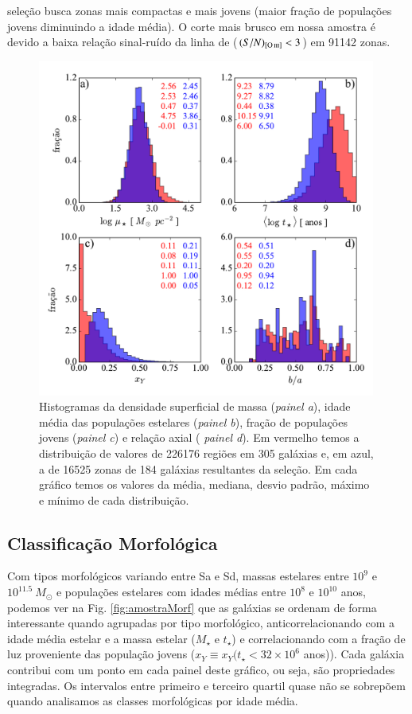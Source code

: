 seleção busca zonas mais compactas e mais jovens (maior fração de populações jovens diminuindo a idade
média). O corte mais brusco em nossa amostra é devido a baixa relação sinal-ruído da linha de \oIII
($(S/N)_{\oIII} < 3$) em 91142 zonas.
\begin{figure}
	\centering
	\includegraphics[width=0.99\textwidth]{figuras/histosample.pdf}
	\caption[Histogramas: densidade superficial de massa, idade média, fração de populações jovens e
	relação axial.] 
	{Histogramas da densidade superficial de massa ({\em painel a}), idade média das populações
estelares ({\em painel b}), fração de populações jovens ({\em painel c}) e relação axial ({\em
painel d}). Em vermelho temos a distribuição de valores de 226176 regiões em 305 galáxias e, em
azul, a de 16525 zonas de 184 galáxias resultantes da seleção. Em cada gráfico temos os valores da
média, mediana, desvio padrão, máximo e mínimo de cada distribuição.}
	\label{fig:histosample}
\end{figure}

\subsection{Classificação Morfológica}
\label{sec:amostra:morf}

Com tipos morfológicos variando entre Sa e Sd, massas estelares entre $10^9$ e $10^{11.5}\ M_\odot$
e populações estelares com idades médias entre $10^8$ e $10^{10}$ anos, podemos ver na Fig.
\ref{fig:amostraMorf} que as galáxias se ordenam de forma interessante quando agrupadas por tipo
morfológico, anticorrelacionando com a idade média estelar e a massa estelar ($M_\star$ e $t_\star$)
e correlacionando com a fração de luz proveniente das população jovens ($x_Y \equiv x_Y (t_\star <
32 \times 10^6$ anos)). Cada galáxia contribui com um ponto em cada painel deste gráfico, ou seja,
são propriedades integradas. Os intervalos entre primeiro e terceiro quartil quase não se sobrepõem
quando analisamos as classes morfológicas por idade média.

